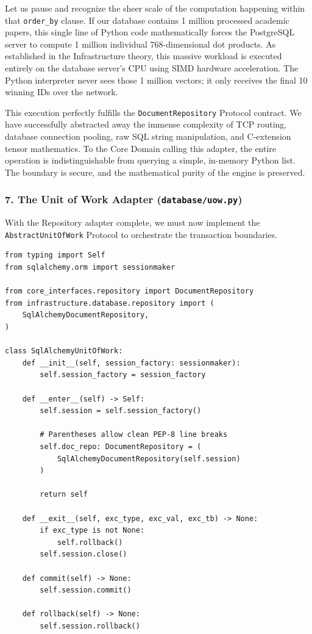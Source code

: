 Let us pause and recognize the sheer scale of the computation happening within that \texttt{order\_by} clause. If our database contains 1 million processed academic papers, this single line of Python code mathematically forces the PostgreSQL server to compute 1 million individual 768-dimensional dot products. As established in the Infrastructure theory, this massive workload is executed entirely on the database server's CPU using SIMD hardware acceleration. The Python interpreter never sees those 1 million vectors; it only receives the final 10 winning IDs over the network.

This execution perfectly fulfills the \texttt{DocumentRepository} Protocol contract. We have successfully abstracted away the immense complexity of TCP routing, database connection pooling, raw SQL string manipulation, and C-extension tensor mathematics. To the Core Domain calling this adapter, the entire operation is indistinguishable from querying a simple, in-memory Python list. The boundary is secure, and the mathematical purity of the engine is preserved.







\subsubsection*{7. The Unit of Work Adapter (\texttt{database/uow.py})}

With the Repository adapter complete, we must now implement the \texttt{AbstractUnitOfWork} Protocol to orchestrate the transaction boundaries.

\begin{lstlisting}[caption={The Unit of Work Adapter (\texttt{uow.py})}]
from typing import Self
from sqlalchemy.orm import sessionmaker

from core_interfaces.repository import DocumentRepository
from infrastructure.database.repository import (
    SqlAlchemyDocumentRepository,
)

class SqlAlchemyUnitOfWork:
    def __init__(self, session_factory: sessionmaker):
        self.session_factory = session_factory

    def __enter__(self) -> Self:
        self.session = self.session_factory()

        # Parentheses allow clean PEP-8 line breaks
        self.doc_repo: DocumentRepository = (
            SqlAlchemyDocumentRepository(self.session)
        )

        return self

    def __exit__(self, exc_type, exc_val, exc_tb) -> None:
        if exc_type is not None:
            self.rollback()
        self.session.close()

    def commit(self) -> None:
        self.session.commit()

    def rollback(self) -> None:
        self.session.rollback()
\end{lstlisting}

